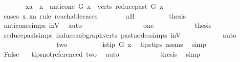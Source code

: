 \begin{isabellebody}
\ \ \ \ \isamarkupfalse%
\ \isamarkupfalse%
\ {\isachardoublequoteopen}xa\ {\isasymin}\ {\isacharbraceleft}{\kern0pt}x{\isacharbraceright}{\kern0pt}\ {\isasymunion}\ anticone\ G\ x\ {\isasymunion}\ verts\ {\isacharparenleft}{\kern0pt}reduce{\isacharunderscore}{\kern0pt}past\ G\ x{\isacharparenright}{\kern0pt}{\isachardoublequoteclose}\isanewline
\ \ \ \ \isamarkupfalse%
{\isacharparenleft}{\kern0pt}\ cases\ x\ xa\ rule{\isacharcolon}{\kern0pt}\ reachable{}{\isacharunderscore}{\kern0pt}cases{\isacharparenright}{\kern0pt}\isanewline
\ \ \ \ \ \ \isamarkupfalse%
\ nR\isanewline
\ \ \ \ \ \ \isamarkupfalse%
\ \isamarkupfalse%
\ {\isacharquery}{\kern0pt}thesis\ \isamarkupfalse%
\ anticone{\isachardot}{\kern0pt}simps\ in{\isacharunderscore}{\kern0pt}V\ \isamarkupfalse%
\ auto\ \isanewline
\ \ \ \ \ \ \isamarkupfalse%
\isanewline
\ \ \ \ \ \ \ \ \isamarkupfalse%
\ one\isanewline
\ \ \ \ \ \ \ \ \isamarkupfalse%
\ \isamarkupfalse%
\ {\isacharquery}{\kern0pt}thesis\ \isamarkupfalse%
\ reduce{\isacharunderscore}{\kern0pt}past{\isachardot}{\kern0pt}simps\ induce{\isacharunderscore}{\kern0pt}subgraph{\isacharunderscore}{\kern0pt}verts\ past{\isacharunderscore}{\kern0pt}nodes{\isachardot}{\kern0pt}simps\ in{\isacharunderscore}{\kern0pt}V\isanewline
\ \ \ \ \ \ \ \ \ \ \isamarkupfalse%
\ auto\isanewline
\ \ \ \ \ \ \isamarkupfalse%
\isanewline
\ \ \ \ \ \ \ \ \isamarkupfalse%
\ two\isanewline
\ \ \ \ \ \ \ \ \isamarkupfalse%
\ {\isachardoublequoteopen}is{\isacharunderscore}{\kern0pt}tip\ G\ x{\isachardoublequoteclose}\ \isamarkupfalse%
\ tips{\isacharunderscore}{\kern0pt}tips\ assms{\isacharparenleft}{\kern0pt}{}{\isacharparenright}{\kern0pt}\ \isamarkupfalse%
\ simp\isanewline
\ \ \ \ \ \ \ \ \isamarkupfalse%
\ \isamarkupfalse%
\ {\isachardoublequoteopen}False{\isachardoublequoteclose}\ \isamarkupfalse%
\ \ tips{\isacharunderscore}{\kern0pt}not{\isacharunderscore}{\kern0pt}referenced\ two\ \isamarkupfalse%
\ auto\isanewline
\ \ \ \ \ \ \ \ \isamarkupfalse%
\ \isamarkupfalse%
\ {\isacharquery}{\kern0pt}thesis\ \isamarkupfalse%
\ simp\isanewline
\ \ \ \ \ \ \isamarkupfalse%
\isanewline
\ \ \ \ \ \ \ \ \isamarkupfalse%

\end{isabellebody}
